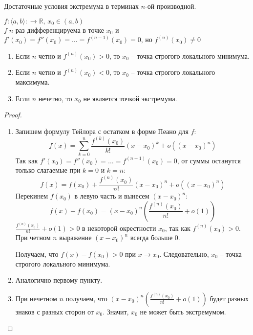 \begin{theorem-non}
    Достаточные условия экстремума в терминах $n$-ой производной.

    $f: \langle a, b \rangle: \to \mathbb{R}, \, x_0 \in (a, b)$ \\
    $f \; n$ раз дифференцируема в точке $x_0$ и $f'(x_0) = f''(x_0) = \dots = f^{(n - 1)}(x_0) = 0$, но $f^{(n)}(x_0) \neq 0$
    \begin{enumerate}
        \item Если $n$ четно и $f^{(n)}(x_0) > 0$, то $x_0$ -- точка строгого локального минимума.
        \item Если $n$ четно и $f^{(n)}(x_0) < 0$, то $x_0$ -- точка строгого локального максимума.
        \item Если $n$ нечетно, то $x_0$ не является точкой экстремума. 
    \end{enumerate}
\end{theorem-non}

\begin{proof}
    \begin{enumerate} $\quad$ \\
        \item Запишем формулу Тейлора с остатком в форме Пеано для $f$: 
        \[ f(x) = \sum_{k = 0}^n \frac{f^{(k)}(x_0)}{k!} (x - x_0)^k + o((x - x_0)^n) \]
        Так как $f'(x_0) = f''(x_0) = \dots = f^{(n - 1)}(x_0) = 0$, от суммы останутся только слагаемые при $k = 0$ и $k = n$: 
        \[ f(x) = f(x_0) + \frac{f^{(n)}(x_0)}{n!} (x - x_0)^n + o((x - x_0)^n) \]
        Перекинем $f(x_0)$ в левую часть и вынесем $(x - x_0)^n$: \[ f(x) - f(x_0) = (x - x_0)^n(\frac{f^{(n)}(x_0)}{n!} + o(1)) \]
        $\frac{f^{(n)}(x_0)}{n!} + o(1) > 0$ в некоторой окрестности $x_0$, так как $f^{(n)}(x_0) > 0$. 
        При четном $n$ выражение $(x - x_0)^n$ всегда больше 0. 
        
        Получаем, что $f(x) - f(x_0) > 0$ при $x \to x_0$. Следовательно, $x_0$ -- точка строгого локального минимума.
        \item Аналогично первому пункту.
        \item При нечетном $n$ получаем, что $(x - x_0)^n(\frac{f^{(n)}(x_0)}{n!} + o(1))$ будет разных знаков с разных сторон от $x_0$. 
        Значит, $x_0$ не может быть экстремумом. 
    \end{enumerate}
\end{proof}
